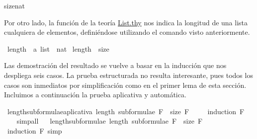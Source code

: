 \begin{isabellebody}
\isamarkupfalse%
{\isachardoublequoteopen}size{\isacharparenleft}{}{\isacharcolon}{\isacharcolon}nat{\isacharparenright}\ {\isacharequal}\ {}{\isachardoublequoteclose}%
\begin{isamarkuptext}%
Por otro lado, la función  de la teoría \href{http://cort.as/-Stfm}{List.thy}
nos indica la longitud de una lista cualquiera de elementos, definiéndose utilizando el comando
 visto anteriormente.%
\end{isamarkuptext}\isamarkuptrue%
\isamarkupfalse%
\ length\ {\isacharcolon}{\isacharcolon}\ {\isachardoublequoteopen}{\isacharprime}a\ list\ {\isasymRightarrow}\ nat{\isachardoublequoteclose}\ \isanewline
{\isachardoublequoteopen}length\ {\isasymequiv}\ size{\isachardoublequoteclose}%
\begin{isamarkuptext}%
Las demostración del resultado se vuelve a basar en la inducción que nos despliega seis casos. 
La prueba estructurada no resulta interesante, pues todos los casos son
inmediatos por simplificación como en el primer lema de esta sección. 
Incluimos a continuación la prueba aplicativa y 
automática.%
\end{isamarkuptext}\isamarkuptrue%
\isamarkupfalse%
\ length{\isacharunderscore}subformulae{\isacharunderscore}aplicativa{\isacharcolon}\ {\isachardoublequoteopen}length\ {\isacharparenleft}subformulae\ F{\isacharparenright}\ {\isacharequal}\ size\ F{\isachardoublequoteclose}\ \isanewline
%
\isadelimproof
\ \ %
\endisadelimproof
%
\isatagproof
{}\isamarkupfalse%
\ {\isacharparenleft}induction\ F{\isacharparenright}\ \isanewline
\ \ \isamarkupfalse%
\ simp{\isacharunderscore}all\isanewline
\ \isamarkupfalse%
%
\endisatagproof
{\isafoldproof}%
%
\isadelimproof
\isanewline
%
\endisadelimproof
\isanewline
{}\isamarkupfalse%
\ length{\isacharunderscore}subformulae{\isacharcolon}\ {\isachardoublequoteopen}length\ {\isacharparenleft}subformulae\ F{\isacharparenright}\ {\isacharequal}\ size\ F{\isachardoublequoteclose}\ \isanewline
%
\isadelimproof
\ \ %
\endisadelimproof
%
\isatagproof
{}\isamarkupfalse%
\ {\isacharparenleft}induction\ F{\isacharsemicolon}\ simp{\isacharparenright}%
\endisatagproof
{\isafoldproof}%
%
\isadelimproof
%
\endisadelimproof
%
\isadelimdocument
%
\endisadelimdocument
%
\isatagdocument
%
\isamarkuptrue%
%
\endisatagdocument
{\isafolddocument}%
%
\isadelimdocument

\end{isabellebody}
